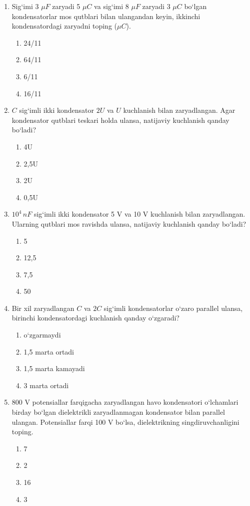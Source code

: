 \begin{enumerate}
\item Sig‘imi 3 $\mu F$ zaryadi 5 $\mu C$ va sig‘imi 8 $\mu F$ zaryadi 3 $\mu C$ bo‘lgan kondensatorlar mos qutblari bilan ulangandan keyin, ikkinchi kondensatordagi zaryadni toping ($\mu C$).
\begin{enumerate}[label=\Alph*)]
\item 24/11
\item 64/11
\item 6/11
\item 16/11
\end{enumerate}

\item $C$ sig‘imli ikki kondensator $2U$ va $U$ kuchlanish bilan zaryadlangan. Agar kondensator qutblari teskari holda ulansa, natijaviy kuchlanish qanday bo‘ladi?
\begin{enumerate}[label=\Alph*)]
\item 4U
\item 2,5U
\item 2U
\item 0,5U
\end{enumerate}

\item $10^4 \, nF$ sig‘imli ikki kondensator 5 V va 10 V kuchlanish bilan zaryadlangan. Ularning qutblari mos ravishda ulansa, natijaviy kuchlanish qanday bo‘ladi?
\begin{enumerate}[label=\Alph*)]
\item 5
\item 12,5
\item 7,5
\item 50
\end{enumerate}

\item Bir xil zaryadlangan $C$ va $2C$ sig‘imli kondensatorlar o‘zaro parallel ulansa, birinchi kondensatordagi kuchlanish qanday o‘zgaradi?
\begin{enumerate}[label=\Alph*)]
\item o‘zgarmaydi
\item 1,5 marta ortadi
\item 1,5 marta kamayadi
\item 3 marta ortadi
\end{enumerate}

\item 800 V potensiallar farqigacha zaryadlangan havo kondensatori o‘lchamlari birday bo‘lgan dielektrikli zaryadlanmagan kondensator bilan parallel ulangan. Potensiallar farqi 100 V bo‘lsa, dielektrikning singdiruvchanligini toping.
\begin{enumerate}[label=\Alph*)]
\item 7
\item 2
\item 16
\item 3
\end{enumerate}


\end{enumerate}
